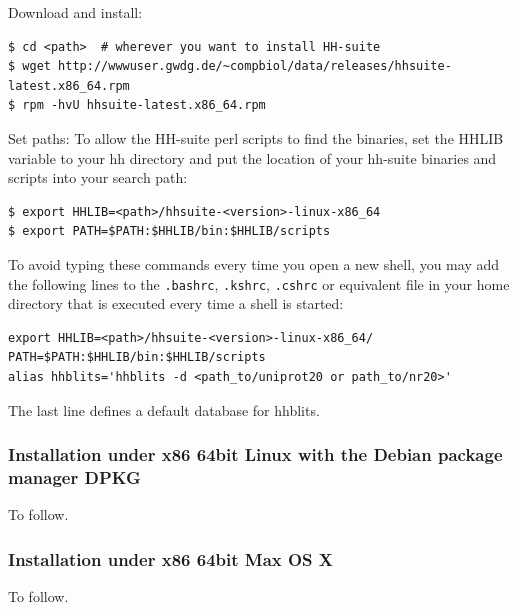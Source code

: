 \documentclass[11pt,a4paper]{article}
\begin{document}
\begin{enum}
\item Download and install:\\[-6mm]
\begin{verbatim}
$ cd <path>  # wherever you want to install HH-suite
$ wget http://wwwuser.gwdg.de/~compbiol/data/releases/hhsuite-latest.x86_64.rpm
$ rpm -hvU hhsuite-latest.x86_64.rpm
\end{verbatim}
\vspace{2mm}

\item Set paths: To allow the HH-suite perl scripts to find the binaries, set the HHLIB variable to your hh directory 
and put the location of your hh-suite binaries and scripts into your search path:\\[-6mm]
\begin{verbatim}
$ export HHLIB=<path>/hhsuite-<version>-linux-x86_64
$ export PATH=$PATH:$HHLIB/bin:$HHLIB/scripts
\end{verbatim}

To avoid typing these commands every time you open a new shell, you may add the following lines to the \verb`.bashrc`, \verb`.kshrc`, \verb`.cshrc` or equivalent file in your home directory that is executed every time a shell is started:
\begin{verbatim}
export HHLIB=<path>/hhsuite-<version>-linux-x86_64/
PATH=$PATH:$HHLIB/bin:$HHLIB/scripts
alias hhblits='hhblits -d <path_to/uniprot20 or path_to/nr20>'
\end{verbatim}
The last line defines a default database for hhblits. 

\end{enum}

\subsubsection*{Installation under x86 64bit Linux with the Debian package manager DPKG}

To follow.


\subsubsection*{Installation under x86 64bit Max OS X}

To follow.
\end{document}
